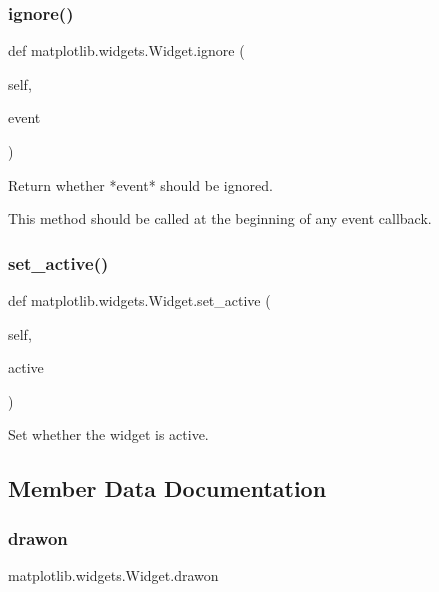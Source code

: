 \subsubsection{\texorpdfstring{ignore()}{ignore()}}
{\footnotesize\ttfamily def matplotlib.\+widgets.\+Widget.\+ignore (\begin{DoxyParamCaption}\item[{}]{self,  }\item[{}]{event }\end{DoxyParamCaption})}

\begin{DoxyVerb}Return whether *event* should be ignored.

This method should be called at the beginning of any event callback.
\end{DoxyVerb}
 \mbox{\label{classmatplotlib_1_1widgets_1_1Widget_a77e00e53e44f4b872499004051120f71}} 
\subsubsection{\texorpdfstring{set\+\_\+active()}{set\_active()}}
{\footnotesize\ttfamily def matplotlib.\+widgets.\+Widget.\+set\+\_\+active (\begin{DoxyParamCaption}\item[{}]{self,  }\item[{}]{active }\end{DoxyParamCaption})}

\begin{DoxyVerb}Set whether the widget is active.\end{DoxyVerb}
 

\subsection{Member Data Documentation}
\mbox{\label{classmatplotlib_1_1widgets_1_1Widget_a5911ae5f43e3cdf8cdc369c0ec25b5dc}} 
\subsubsection{\texorpdfstring{drawon}{drawon}}
{\footnotesize\ttfamily matplotlib.\+widgets.\+Widget.\+drawon\hspace{0.3cm}{\ttfamily [static]}}

